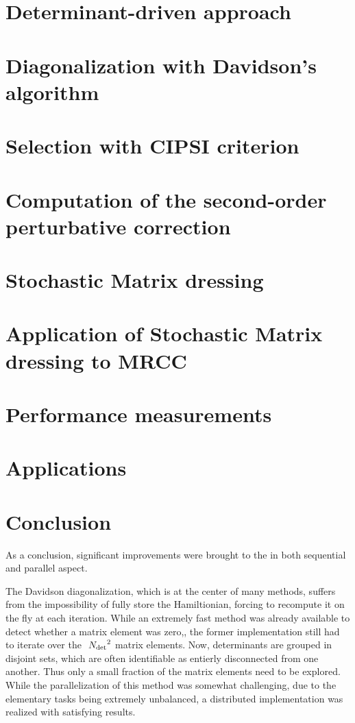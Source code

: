 \documentclass[12pt,a4paper]{report}
\begin{document}
\chapter{Determinant-driven approach}
\minitoc


\chapter{Diagonalization with Davidson's algorithm}
\minitoc


\chapter{Selection with CIPSI criterion}
\minitoc


\chapter{Computation of the second-order perturbative correction}
\minitoc


\chapter{Stochastic Matrix dressing}
\minitoc


\chapter{Application of Stochastic Matrix dressing to MRCC}
\minitoc


\chapter{Performance measurements}
\minitoc


\chapter{Applications}
\minitoc


\chapter{Conclusion}

As a conclusion, significant improvements were brought to the \QP in both sequential and parallel aspect.

The Davidson diagonalization, which is at the center of many methods, suffers from the impossibility of fully store the Hamiltionian, forcing to recompute it on the fly at each iteration. While an extremely fast method was already available to detect whether a matrix element was zero,\cite{Scemama_2013}, the former implementation still had to iterate over the $~{N_\text{det}}^2$ matrix elements. Now, determinants are grouped in disjoint sets, which are often identifiable as entierly disconnected from one another. Thus only a small fraction of the matrix elements need to be explored.
While the parallelization of this method was somewhat challenging, due to the elementary tasks being extremely unbalanced, a distributed implementation was realized with satisfying results.
\end{document}
